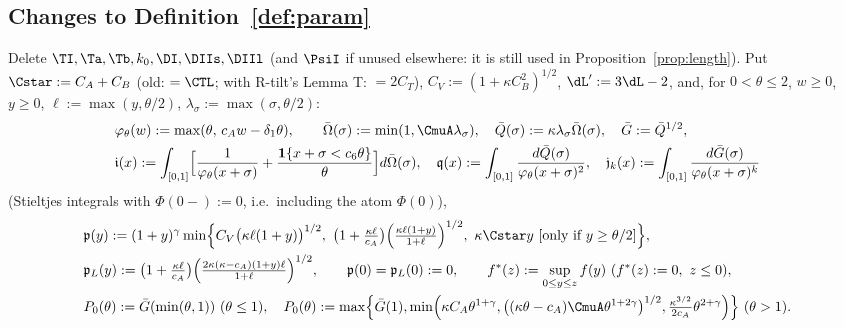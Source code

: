 
\subsection*{Changes to Definition~\ref{def:param}}
Delete $\TI,\Ta,\Tb,k_0,\DI,\DIIs,\DIIl$ (and $\PsiI$ if unused elsewhere: it is still used in Proposition~\ref{prop:length}).
Put $\Cstar:=C_A+C_B$ (old: $=\CTL$; with R-tilt's Lemma T: $=2C_T$), $C_V:=(1+\kappa C_B^2)^{1/2}$, $\dL':=3\dL-2$,
and, for $0<\theta\le2$, $w\ge0$, $y\ge0$, $\ell:=\max(y,\theta/2)$, $\lambda_\sigma:=\max(\sigma,\theta/2)$:
\begin{align*}
&\varphi_\theta(w):=\max(\theta,\,c_Aw-\delta_1\theta),\qquad
 \bar\Omega(\sigma):=\min(1,\CmuA\lambda_\sigma),\quad \bar Q(\sigma):=\kappa\lambda_\sigma\bar\Omega(\sigma),\quad
 \bar G:=\bar Q^{1/2},\\
&\mathfrak i(x):=\int_{[0,1]}\Bigl[\frac1{\varphi_\theta(x+\sigma)}+\frac{\mathbf 1\{x+\sigma<c_6\theta\}}{\theta}\Bigr]d\bar\Omega(\sigma),\quad
 \mathfrak q(x):=\int_{[0,1]}\frac{d\bar Q(\sigma)}{\varphi_\theta(x+\sigma)^2},\quad
 \mathfrak j_k(x):=\int_{[0,1]}\frac{d\bar G(\sigma)}{\varphi_\theta(x+\sigma)^k}
\end{align*}
(Stieltjes integrals with $\Phi(0-):=0$, i.e.\ including the atom $\Phi(0)$),
\begin{align*}
&\mathfrak p(y):=(1+y)^\gamma\min\Bigl\{C_V\bigl(\kappa\ell(1+y)\bigr)^{1/2},\ \bigl(1+\tfrac{\kappa\ell}{c_A}\bigr)
 \Bigl(\tfrac{\kappa\ell(1+y)}{1+\ell}\Bigr)^{1/2},\ \kappa\Cstar y\ [\text{only if }y\ge\theta/2]\Bigr\},\\
&\mathfrak p_L(y):=\bigl(1+\tfrac{\kappa\ell}{c_A}\bigr)\Bigl(\tfrac{2\kappa(\kappa-c_A)(1+y)\ell}{1+\ell}\Bigr)^{1/2},\qquad
 \mathfrak p(0)=\mathfrak p_L(0):=0,\qquad f^*(z):=\sup_{0\le y\le z}f(y)\ (f^*(z):=0,\ z\le0),\\
&P_0(\theta):=\bar G(\min(\theta,1))\ (\theta\le1),\quad
 P_0(\theta):=\max\Bigl\{\bar G(1),\min\Bigl(\kappa C_A\theta^{1+\gamma},\bigl((\kappa\theta-c_A)\CmuA\theta^{1+2\gamma}\bigr)^{1/2},
 \tfrac{\kappa^{3/2}}{2c_A}\theta^{2+\gamma}\Bigr)\Bigr\}\ (\theta>1).
\end{align*}
